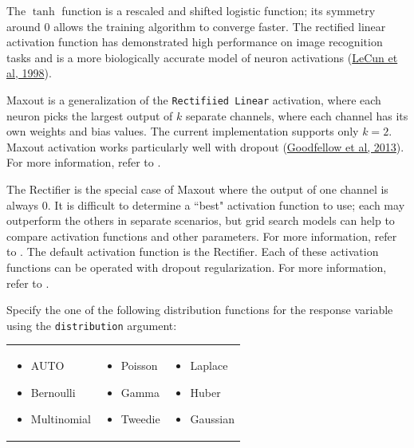 The $\tanh$ function is a rescaled and shifted logistic function; its symmetry around 0 allows the training algorithm to converge faster. The rectified linear activation function has demonstrated high performance on image recognition tasks and is a more biologically accurate model of neuron activations (\href{http://yann.lecun.com/exdb/publis/pdf/lecun-98b.pdf}{LeCun et al, 1998}). 

Maxout is a generalization of the \texttt{Rectifiied Linear} activation, where each neuron picks the largest output of $k$ separate channels, where each channel has its own weights and bias values. The current implementation supports only $k=2$. Maxout activation works particularly well with dropout (\href{http://arxiv.org/pdf/1302.4389.pdf}{Goodfellow et al, 2013}). For more information, refer to {\textbf{}}.

The Rectifier is the special case of Maxout where the output of one channel is always 0.
It is difficult to determine a ``best" activation function to use; each may outperform the others in separate scenarios, but grid search models can help to compare activation functions and other parameters.  For more information, refer to {\textbf{}}. The default activation function is the Rectifier. Each of these activation functions can be operated with dropout regularization. For more information, refer to {\textbf{}}.

Specify the one of the following distribution functions for the response variable using the \texttt{distribution} argument: 

\begin{frame}%

\begin{tabular}{p{4cm}p{4cm}p{4cm}}

\begin{itemize}
     \item AUTO
     \item Bernoulli
     \item Multinomial
  \end{itemize} &

\begin{itemize}
  \item Poisson
  \item Gamma
  \item Tweedie
\end{itemize} &

\begin{itemize}
  \item Laplace
  \item Huber
  \item Gaussian
\end{itemize}\\

\end{tabular}

\end{frame}

